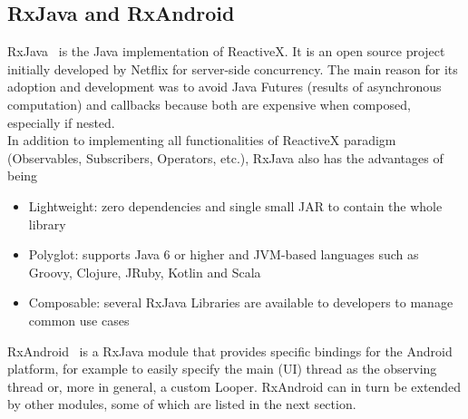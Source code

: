 \documentclass[11pt,a4paper,notitlepage]{article}
\begin{document}
\subsection{RxJava and RxAndroid}
RxJava~\cite{RxJava} is the Java implementation of ReactiveX. It is an open source project initially developed by Netflix for server-side concurrency. The main reason for its adoption and development was to avoid Java Futures (results of asynchronous computation) and callbacks because both are expensive when composed, especially if nested.\smallskip \\
In addition to implementing all functionalities of ReactiveX paradigm (Observables, Subscribers, Operators, etc.), RxJava also has the advantages of being
\begin{itemize}
	\item Lightweight: zero dependencies and single small JAR to contain the whole library
	\item Polyglot: supports Java 6 or higher and JVM-based languages such as Groovy, Clojure, JRuby, Kotlin and Scala
	\item Composable: several RxJava Libraries are available to developers to manage  common use cases
\end{itemize} \bigskip
RxAndroid~\cite{RxAndroid} is a RxJava module that provides specific bindings for the Android platform, for example to easily specify the main (UI) thread as the observing thread or, more in general, a custom Looper. RxAndroid can in turn be extended by other modules, some of which are listed in the next section.
\end{document}
